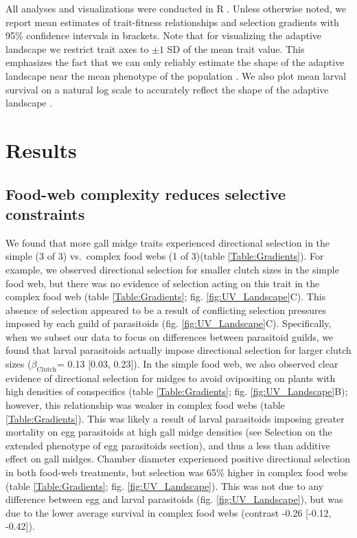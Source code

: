 \documentclass[11pt,]{article}
\begin{document}
All analyses and visualizations were conducted in R \citep{R2018}.
Unless otherwise noted, we report mean estimates of trait-fitness
relationships and selection gradients with 95\% confidence intervals in
brackets. Note that for visualizing the adaptive landscape we restrict
trait axes to \(\pm 1\) SD of the mean trait value. This emphasizes the
fact that we can only reliably estimate the shape of the adaptive
landscape near the mean phenotype of the population \citep{Arnold2001}.
We also plot mean larval survival on a natural log scale to accurately
reflect the shape of the adaptive landscape \citep{Arnold2003}.

\section{Results}\label{results}

\subsection{Food-web complexity reduces selective
constraints}\label{food-web-complexity-reduces-selective-constraints}

\indent We found that more gall midge traits experienced directional
selection in the simple (3 of 3) vs.~complex food webs (1 of 3)(table
\ref{Table:Gradients}). For example, we observed directional selection
for smaller clutch sizes in the simple food web, but there was no
evidence of selection acting on this trait in the complex food web
(table \ref{Table:Gradients}; fig. \ref{fig:UV_Landscape}C). This
absence of selection appeared to be a result of conflicting selection
pressures imposed by each guild of parasitoids (fig.
\ref{fig:UV_Landscape}C). Specifically, when we subset our data to focus
on differences between parasitoid guilds, we found that larval
parasitoids actually impose directional selection for larger clutch
sizes (\(\beta_{\text{Clutch}}\)= 0.13 {[}0.03, 0.23{]}). In the simple
food web, we also observed clear evidence of directional selection for
midges to avoid ovipositing on plants with high densities of
conspecifics (table \ref{Table:Gradients}; fig.
\ref{fig:UV_Landscape}B); however, this relationship was weaker in
complex food webs (table \ref{Table:Gradients}). This was likely a
result of larval parasitoids imposing greater mortality on egg
parasitoids at high gall midge densities (see Selection on the extended
phenotype of egg parasitoids section), and thus a less than additive
effect on gall midges. Chamber diameter experienced positive directional
selection in both food-web treatments, but selection was 65\% higher in
complex food webs (table \ref{Table:Gradients}; fig.
\ref{fig:UV_Landscape}). This was not due to any difference between egg
and larval parasitoids (fig. \ref{fig:UV_Landscape}), but was due to the
lower average survival in complex food webs (contrast -0.26 {[}-0.12,
-0.42{]}).
\end{document}
